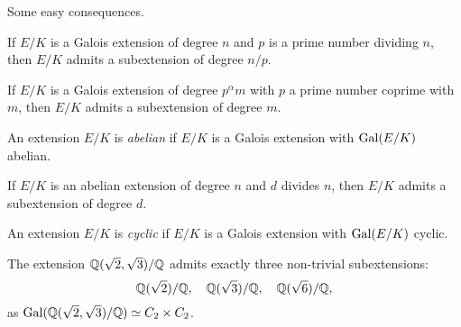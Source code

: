 Some easy consequences.

\begin{exercise}
\label{xca:Cauchy+Galois}
    If $E/K$ is a Galois extension of degree $n$ and
    $p$ is a prime number dividing $n$, then $E/K$ admits
    a subextension of degree $n/p$. 
\end{exercise}
    
\begin{exercise}
\label{xca:Sylow+Galois}
    If $E/K$ is a Galois extension of degree $p^\alpha m$ with
    $p$ a prime number coprime with $m$, then $E/K$ admits 
    a subextension of degree $m$. 
\end{exercise}

\begin{definition}
    An extension $E/K$ is \emph{abelian} if $E/K$ is a Galois extension
    with $\operatorname{Gal}(E/K)$ abelian.
\end{definition}

\begin{exercise}
    If $E/K$ is an abelian extension of degree $n$ and $d$ divides
    $n$, then $E/K$ admits a subextension of degree $d$. 
\end{exercise}

\begin{definition}
    An extension $E/K$ is \emph{cyclic} if $E/K$ is 
    a Galois extension with $\operatorname{Gal}(E/K)$ cyclic. 
\end{definition}

\begin{example}
    The extension $\mathbb{Q}(\sqrt{2},\sqrt{3})/\mathbb{Q}$ admits
    exactly three non-trivial subextensions: 
    \[
    \mathbb{Q}(\sqrt{2})/\mathbb{Q},
    \quad
    \mathbb{Q}(\sqrt{3})/\mathbb{Q},
    \quad 
    \mathbb{Q}(\sqrt{6})/\mathbb{Q},
    \]
    as $\operatorname{Gal}(\mathbb{Q}(\sqrt{2},\sqrt{3})/\mathbb{Q})\simeq C_2\times C_2$. 
\end{example}

